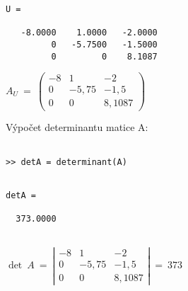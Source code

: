\documentclass[a4paper,10pt]{article}
\begin{document}
\begin{minipage}[t]{.5\textwidth}
\begin{verbatim}
U =

   -8.0000    1.0000   -2.0000
         0   -5.7500   -1.5000
         0         0    8.1087

\end{verbatim}
\end{minipage}%
\begin{minipage}[t]{.5\textwidth}

\bigskip

$
A_U~=~
\left( \begin{array}{rrr}
  -8 &  1 	& -2 \\
   0 & -5,75 & -1,5 \\
   0 & 0	&  8,1087 
\end{array} \right)
$

\vfill

\end{minipage}


\par Výpočet determinantu matice A:

\begin{verbatim}

>> detA = determinant(A)

\end{verbatim}

\begin{minipage}[t]{.5\textwidth}
\begin{verbatim}

detA =

  373.0000
  
\end{verbatim}
\end{minipage}%
\begin{minipage}[t]{.5\textwidth}

\bigskip

$
\det~A~=~
\left| \begin{array}{rrr}
  -8 &  1 	& -2 \\
   0 & -5,75 & -1,5 \\
   0 & 0	&  8,1087 
\end{array} \right|
~=~373
$

\vfill

\end{minipage}
\end{document}

